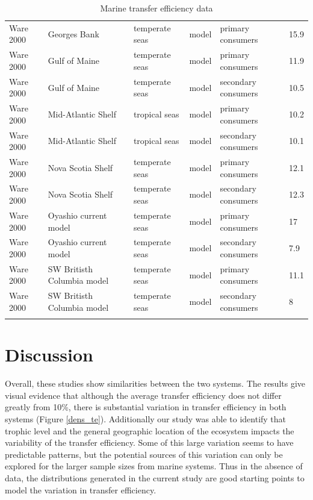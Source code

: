 \documentclass[oneside,12pt,final]{sty/ucthesis-CA2012}
\begin{document}
\begin{mainmatter}
\begin{longtable} {p{4cm}p{3cm}p{2cm}lp{2cm}p{2cm}}
    Ware 2000  & Georges Bank & temperate seas & model & primary consumers & 15.9 \\
    Ware 2000   & Gulf of Maine & temperate seas & model & primary consumers & 11.9 \\
    Ware 2000  & Gulf of Maine & temperate seas & model & secondary consumers & 10.5 \\
    Ware 2000  & Mid-Atlantic Shelf & tropical seas & model & primary consumers & 10.2 \\
    Ware 2000   & Mid-Atlantic Shelf & tropical seas & model & secondary consumers & 10.1 \\
    Ware 2000   & Nova Scotia Shelf & temperate seas & model & primary consumers & 12.1 \\
    Ware 2000   & Nova Scotia Shelf & temperate seas & model & secondary consumers & 12.3 \\
    Ware 2000   & Oyashio current model & temperate seas & model & primary consumers & 17 \\
    Ware 2000   & Oyashio current model & temperate seas & model & secondary consumers & 7.9 \\
    Ware 2000   & SW Britisth Columbia model & temperate seas & model & primary consumers & 11.1 \\
    Ware 2000   & SW Britisth Columbia model & temperate seas & model & secondary consumers & 8 \\
    \bottomrule
    \caption{Marine transfer efficiency data}
    \label{datamar}
    \end{longtable}


\section{Discussion}
Overall, these studies show similarities between the two systems. The results give visual evidence that although the average transfer efficiency does not differ greatly from 10\%, there is substantial variation in transfer efficiency in both systems (Figure \ref{dens_te}). Additionally our study was able to identify that trophic level and the general geographic location of the ecosystem impacts the variability of the transfer efficiency. Some of this large variation seems to have predictable patterns, but the potential sources of this variation can only be explored for the larger sample sizes from marine systems. Thus in the absence of data, the distributions generated in the current study are good starting points to model the variation in transfer efficiency. 


\end{mainmatter}
\end{document}
